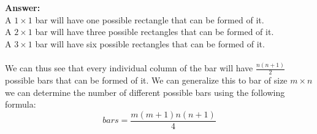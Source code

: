 \documentclass[a4paper,12pt]{article}
\begin{document}
\begin{enumerate}
	\textbf{Answer:} \\
	A $1 \times 1$ bar will have one possible rectangle that can be formed of it. \\
	A $2 \times 1$ bar will have three possible rectangles that can be formed of it. \\
	A $3 \times 1$ bar will have six possible rectangles that can be formed of it. \\ \\
	We can thus see that every individual column of the bar will have $\frac{n(n+1)}{2}$ possible bars that can be formed of it.
	We can generalize this to bar of size $m \times n$ we can determine the number of different possible bars using the following formula: \[bars = \frac{m(m+1)n(n+1)}{4} \] 

\end{enumerate}
\end{document}
